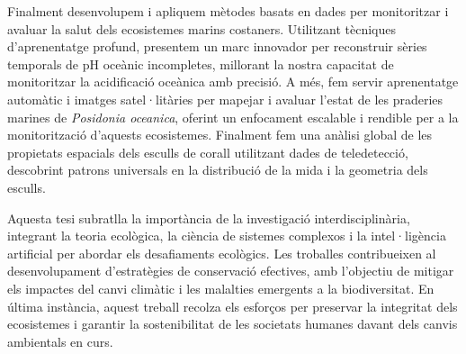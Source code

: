 Finalment desenvolupem i apliquem mètodes basats en dades per monitoritzar i
avaluar la salut dels ecosistemes marins costaners. Utilitzant tècniques
d'aprenentatge profund, presentem un marc innovador per reconstruir sèries
temporals de pH oceànic incompletes, millorant la nostra capacitat de
monitoritzar la acidificació oceànica amb precisió. A més, fem servir
aprenentatge automàtic i imatges satel·litàries per mapejar i avaluar l'estat
de les praderies marines de \textit{Posidonia oceanica}, oferint un enfocament
escalable i rendible per a la monitorització d'aquests ecosistemes. Finalment
fem una anàlisi global de les propietats espacials dels esculls de corall
utilitzant dades de teledetecció, descobrint patrons universals en la
distribució de la mida i la geometria dels esculls.

Aquesta tesi subratlla la importància de la investigació interdisciplinària,
integrant la teoria ecològica, la ciència de sistemes complexos i la
intel·ligència artificial per abordar els desafiaments ecològics. Les troballes
contribueixen al desenvolupament d'estratègies de conservació efectives, amb
l'objectiu de mitigar els impactes del canvi climàtic i les malalties
emergents a la biodiversitat. En última instància, aquest treball recolza els
esforços per preservar la integritat dels ecosistemes i garantir la
sostenibilitat de les societats humanes davant dels canvis ambientals en
curs.

\vfill